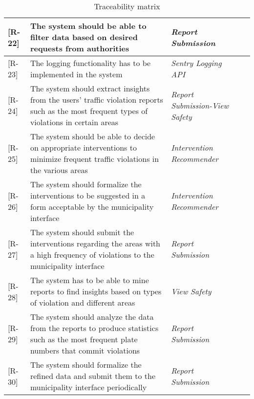 \begin{table}[H]
\begin{tabulary}{\textwidth}{|J|J|J|J|J|}
 [R-22] & The system should be able to filter data based on desired requests from authorities & \emph{Report Submission} 		\\ \hline 

 [R-23] & The logging functionality has to be implemented in the system & \emph{Sentry Logging API} 		\\ \hline 

 [R-24] &  The system should extract insights from the users’ traffic violation reports such as the most frequent types of violations in certain areas & \emph{Report Submission-View Safety} 		\\ \hline 

 [R-25] & The system should be able to decide on appropriate interventions to minimize frequent traffic violations in the various areas
 & \emph{Intervention Recommender} 		\\ \hline 

 [R-26] & The system should formalize the interventions to be suggested in a form acceptable by the municipality interface & \emph{Intervention Recommender} 		\\ \hline 

 [R-27] & The system should submit the interventions regarding the areas with a high frequency of violations to the municipality interface & \emph{Report Submission} 		\\ \hline 

 [R-28] & The system has to be able to mine reports to find insights based on types of violation and different areas & \emph{View Safety} 		\\ \hline 

 [R-29] & The system should analyze the data from the reports to produce statistics such as the most frequent plate numbers that commit violations & \emph{Report Submission} 		\\ \hline 

 [R-30] & The system should formalize the refined data and submit them to the municipality interface periodically & \emph{Report Submission} 		\\ \hline 


\end{tabulary}
\caption{\label{tab:Usecase-View-Safety}Traceability matrix}
\end{table}


